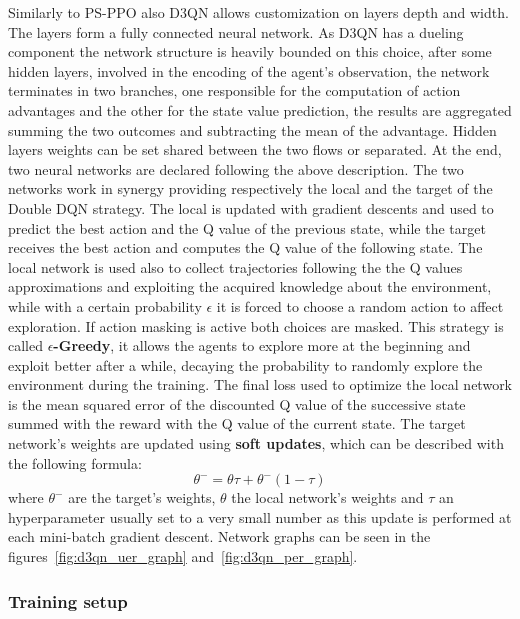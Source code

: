 \documentclass[11pt, a4paper, hidelinks]{report}
\begin{document}
Similarly to PS-PPO also D3QN allows customization on layers depth and width.
The layers form a fully connected neural network.
As D3QN has a dueling component the network structure is heavily bounded on this choice, after some hidden layers, involved in the encoding of the agent's observation, the network terminates in two branches, one responsible for the computation of action advantages and the other for the state value prediction, the results are aggregated summing the two outcomes and subtracting the mean of the advantage.
Hidden layers weights can be set shared between the two flows or separated.
At the end, two neural networks are declared following the above description.
The two networks work in synergy providing respectively the local and the target of the Double DQN strategy.
The local is updated with gradient descents and used to predict the best action and the Q value of the previous state, while the target receives the best action and computes the Q value of the following state.
The local network is used also to collect trajectories following the the Q values approximations and exploiting the acquired knowledge about the environment, while with a certain probability $\epsilon$ it is forced to choose a random action to affect exploration.
If action masking is active both choices are masked.
This strategy is called \textbf{$\epsilon$-Greedy}, it allows the agents to explore more at the beginning and exploit better after a while, decaying the probability to randomly explore the environment during the training.
The final loss used to optimize the local network is the mean squared error of the discounted Q value of the successive state summed with the reward with the Q value of the current state.
The target network's weights are updated using \textbf{soft updates}, which can be described with the following formula:
\begin{equation}
	\theta^{-} = \theta \tau + \theta^{-}(1 - \tau)\label{eq:soft-update}
\end{equation}
where $\theta^{-}$ are the target's weights, $\theta$ the local network's weights and $\tau$ an hyperparameter usually set to a very small number as this update is performed at each mini-batch gradient descent.
Network graphs can be seen in the figures~\ref{fig:d3qn_uer_graph} and~\ref{fig:d3qn_per_graph}.

\subsubsection{Training setup}\label{subsubsec:training-setup2}
\end{document}
